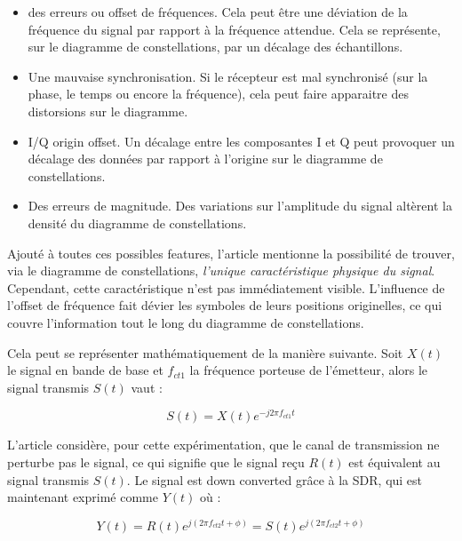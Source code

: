 \begin{itemize}
\item des erreurs ou offset de fréquences. Cela peut être une déviation de la fréquence du signal par rapport à la fréquence attendue. Cela se représente, sur le diagramme de constellations, par un décalage des échantillons. 
\item Une mauvaise synchronisation. Si le récepteur est mal synchronisé (sur la phase, le temps ou encore la fréquence), cela peut faire apparaitre des distorsions sur le diagramme.
\item \ac{I/Q} origin offset. Un décalage entre les composantes I et Q peut provoquer un décalage des données par rapport à l'origine sur le diagramme de constellations.
\item Des erreurs de magnitude. Des variations sur l'amplitude du signal altèrent la densité du diagramme de constellations.
\end{itemize}

\vspace{0.1cm}

Ajouté à toutes ces possibles features, l'article mentionne la possibilité de trouver, via le diagramme de constellations, \textit{l'unique caractéristique physique du signal}. Cependant, cette caractéristique n'est pas immédiatement visible. L'influence de l'offset de fréquence fait dévier les symboles de leurs positions originelles, ce qui couvre l'information tout le long du diagramme de constellations.

\vspace{0.1cm}

Cela peut se représenter mathématiquement de la manière suivante. Soit $X(t)$ le signal en bande de base et $f_{ct1}$ la fréquence porteuse de l'émetteur, alors le signal transmis $S(t)$ vaut :

\begin{equation}\label{eq4000}
	S(t) = X(t) e^{-j2\pi f_{ct1} t}
\end{equation} 

L'article considère, pour cette expérimentation, que le canal de transmission ne perturbe pas le signal, ce qui signifie que le signal reçu $R(t)$ est équivalent au signal transmis $S(t)$. Le signal est down converted grâce à la \ac{SDR}, qui est maintenant exprimé comme $Y(t)$ où :

\begin{equation}\label{eq4001}
	Y(t) = R(t) e^{j(2\pi f_{ct2} t + \phi)} = S(t) e^{j(2\pi f_{ct2} t + \phi)}
\end{equation} 

